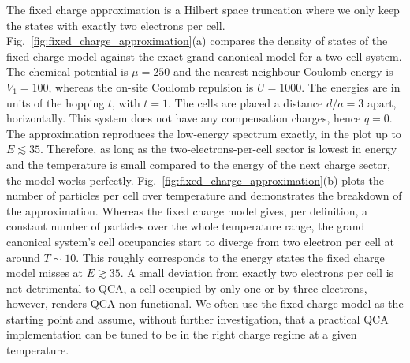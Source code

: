 %
The fixed charge approximation is a Hilbert space truncation where we only keep
the states with exactly two electrons per cell.
Fig.~\ref{fig:fixed_charge_approximation}(a) compares the density of states of
the fixed charge model against the exact grand canonical model for a two-cell
system. The chemical potential is $\mu = 250$ and the nearest-neighbour Coulomb
energy is $V_1 = 100$, whereas the on-site Coulomb repulsion is $U = 1000$. The
energies are in units of the hopping $t$, with $t = 1$. The cells are placed a
distance $d/a = 3$ apart, horizontally. This system does not have any
compensation charges, hence $q = 0$. The approximation reproduces the low-energy
spectrum exactly, in the plot up to $E \lesssim 35$. Therefore, as long as the
two-electrons-per-cell sector is lowest in energy and the temperature is small
compared to the energy of the next charge sector, the model works perfectly.
Fig.~\ref{fig:fixed_charge_approximation}(b) plots the number of particles per
cell over temperature and demonstrates the breakdown of the approximation.
Whereas the fixed charge model gives, per definition, a constant number of
particles over the whole temperature range, the grand canonical system's cell
occupancies start to diverge from two electron per cell at around $T \sim 10$.
This roughly corresponds to the energy states the fixed charge model misses at
$E \gtrsim 35$. A small deviation from exactly two electrons per cell is not
detrimental to QCA, a cell occupied by only one or by three electrons, however,
renders QCA non-functional. We often use the fixed charge model as the starting
point and assume, without further investigation, that a practical QCA
implementation can be tuned to be in the right charge regime at a given
temperature.

